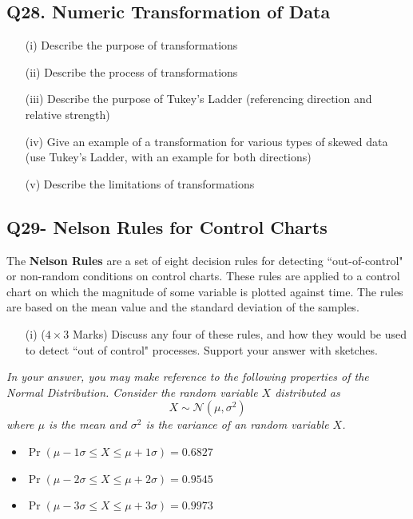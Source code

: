 \documentclass[a4paper,12pt]{article}
\begin{document}
\subsection*{Q28. Numeric Transformation of Data} %


\begin{itemize}
	\item[(i)] Describe the purpose of transformations
	\item[(ii)] Describe the process of transformations
	\item[(iii)] Describe the purpose of Tukey's Ladder (referencing direction and relative strength)
	\item[(iv)] Give an example of a transformation for various types of skewed data (use Tukey's Ladder, with an example for both directions)
	\item[(v)] Describe the limitations of transformations
\end{itemize}


\subsection*{Q29- Nelson Rules for Control Charts}
The \textbf{Nelson Rules} are a set of eight decision rules for detecting ``out-of-control" or non-random conditions on control charts. These rules are applied to a control chart on which the magnitude of some variable is plotted against time. The rules are based on the mean value and the standard deviation of the samples.\\

\begin{itemize}
	\item[(i)] ($4 \times 3$ Marks) Discuss any four of these rules, and how they would be used to detect ``out of control" processes. Support your answer with sketches.
\end{itemize}

\bigskip 
\begin{framed}
	\noindent \textit{In your answer, you may make reference to the following properties of the Normal Distribution. Consider the random variable $X$ distributed as
		\[X \sim \mathcal{N}(\mu,\sigma^2)\]
		where $\mu$ is the mean and $\sigma^2$ is the variance of an random variable $X$.}
	\begin{itemize}
		\item $\Pr( \mu - 1\sigma \leq X \leq \mu + 1\sigma ) = 0.6827$
		\item $\Pr( \mu - 2\sigma \leq X \leq \mu + 2\sigma ) = 0.9545$
		\item $\Pr( \mu - 3\sigma \leq X \leq \mu + 3\sigma )= 0.9973$
		
	\end{itemize}
\end{framed}
\end{document}
